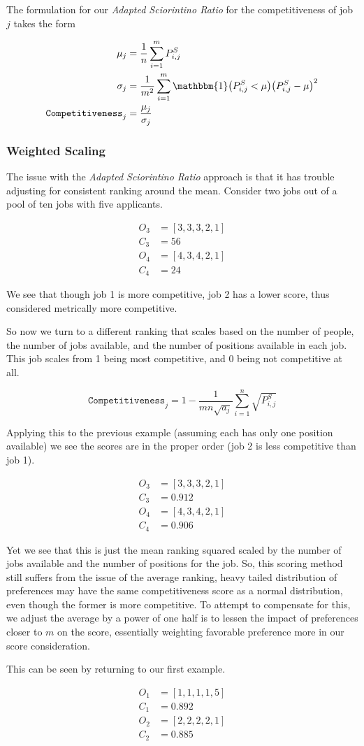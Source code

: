 The formulation for our \textit{Adapted Sciorintino Ratio} for the competitiveness of job $j$ takes the form

\begin{align}
\mu_j &= \frac{1}{n} \sum_{i=1}^m P^S_{i,j} \\
\sigma_j &= \frac{1}{m^2} \sum_{i=1}^m \mathbbm{1}\big( P^S_{i,j} < \mu \big) \big(P^S_{i,j} - \mu \big)^2 \\
\texttt{Competitiveness}_j &= \frac{\mu_j}{\sigma_j}
\end{align}

\subsubsection{Weighted Scaling}

The issue with the \textit{Adapted Sciorintino Ratio} approach is that it has trouble adjusting for consistent ranking around the mean. Consider two jobs out of a pool of ten jobs with five applicants.

\begin{align}
O_3 &= [3,3,3,2,1] \\
C_3 &= 56\\
O_4 &= [4,3,4,2,1] \\
C_4 &= 24
\end{align}

We see that though job 1 is more competitive, job 2 has a lower score, thus considered metrically more competitive.

So now we turn to a different ranking that scales based on the number of people, the number of jobs available, and the number of positions available in each job. This job scales from 1 being most competitive, and 0 being not competitive at all.

\[\texttt{Competitiveness}_j = 1 - \frac{1}{mn \sqrt{a_j}} \sum_{i=1}^n \sqrt{P^S_{i,j}}\]

Applying this to the previous example (assuming each has only one position available) we see the scores are in the proper order (job 2 is less competitive than job 1).

\begin{align}
O_3 &= [3,3,3,2,1] \\
C_3 &= 0.912\\
O_4 &= [4,3,4,2,1] \\
C_4 &= 0.906
\end{align}

Yet we see that this is just the mean ranking squared scaled by the number of jobs available and the number of positions for the job. So, this scoring method still suffers from the issue of the average ranking, heavy tailed distribution of preferences may have the same competitiveness score as a normal distribution, even though the former is more competitive. To attempt to compensate for this, we adjust the average by a power of one half is to lessen the impact of preferences closer to $m$ on the score, essentially weighting favorable preference more in our score consideration.

This can be seen by returning to our first example.

\begin{align}
O_1 &= [1,1,1,1,5] \\
C_1 &= 0.892\\
O_2 &= [2,2,2,2,1] \\
C_2 &= 0.885
\end{align}
 